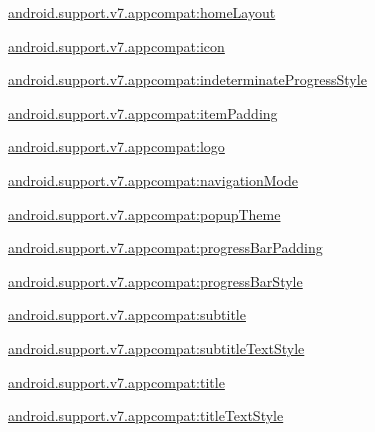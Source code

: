 {\ttfamily \hyperlink{classandroid_1_1support_1_1v7_1_1appcompat_1_1R_1_1styleable_a0775c0044a13b8aa06224d0a00977810}{android.\+support.\+v7.\+appcompat\+:home\+Layout}}

{\ttfamily \hyperlink{classandroid_1_1support_1_1v7_1_1appcompat_1_1R_1_1styleable_acfb20700021f93a2cdd2586aeb379c82}{android.\+support.\+v7.\+appcompat\+:icon}}

{\ttfamily \hyperlink{classandroid_1_1support_1_1v7_1_1appcompat_1_1R_1_1styleable_a75ab0a5b4767d10e8ce49dbe359dea72}{android.\+support.\+v7.\+appcompat\+:indeterminate\+Progress\+Style}}

{\ttfamily \hyperlink{classandroid_1_1support_1_1v7_1_1appcompat_1_1R_1_1styleable_af0906dce1243c89d098dc26008a19abc}{android.\+support.\+v7.\+appcompat\+:item\+Padding}}

{\ttfamily \hyperlink{classandroid_1_1support_1_1v7_1_1appcompat_1_1R_1_1styleable_af3aef2f5b7b75893c09e942708608f9c}{android.\+support.\+v7.\+appcompat\+:logo}}

{\ttfamily \hyperlink{classandroid_1_1support_1_1v7_1_1appcompat_1_1R_1_1styleable_a6970d0c5badc93f2c02b15104e119735}{android.\+support.\+v7.\+appcompat\+:navigation\+Mode}}

{\ttfamily \hyperlink{classandroid_1_1support_1_1v7_1_1appcompat_1_1R_1_1styleable_a3757638bea80d4164add30913722be34}{android.\+support.\+v7.\+appcompat\+:popup\+Theme}}

{\ttfamily \hyperlink{classandroid_1_1support_1_1v7_1_1appcompat_1_1R_1_1styleable_ac185772374425947fc0c482c54c60753}{android.\+support.\+v7.\+appcompat\+:progress\+Bar\+Padding}}

{\ttfamily \hyperlink{classandroid_1_1support_1_1v7_1_1appcompat_1_1R_1_1styleable_abad5be4f45f4786c801289bba4a89a4c}{android.\+support.\+v7.\+appcompat\+:progress\+Bar\+Style}}

{\ttfamily \hyperlink{classandroid_1_1support_1_1v7_1_1appcompat_1_1R_1_1styleable_ae46a2e4e5897b33e577ca1249abd9c75}{android.\+support.\+v7.\+appcompat\+:subtitle}}

{\ttfamily \hyperlink{classandroid_1_1support_1_1v7_1_1appcompat_1_1R_1_1styleable_ae699f5e7552d0d0606b59fa333bcde13}{android.\+support.\+v7.\+appcompat\+:subtitle\+Text\+Style}}

{\ttfamily \hyperlink{classandroid_1_1support_1_1v7_1_1appcompat_1_1R_1_1styleable_a67bcd46a24ee17f6a54d62d4b7d1b669}{android.\+support.\+v7.\+appcompat\+:title}}

{\ttfamily \hyperlink{classandroid_1_1support_1_1v7_1_1appcompat_1_1R_1_1styleable_a488241f95872a905692b67f683e04ce5}{android.\+support.\+v7.\+appcompat\+:title\+Text\+Style}}


